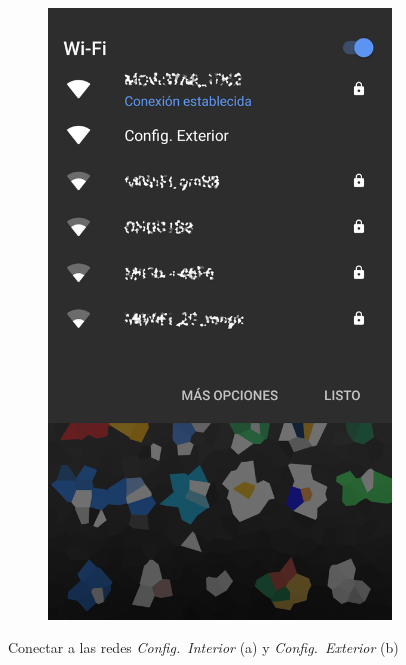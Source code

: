 \begin{figure}
\begin{subfigure}{0.49\columnwidth}
  \includegraphics[width=1\columnwidth,frame]{images/exterior-select-wifi}
  \caption{}
  \label{fig:exterior-select-wifi}
\end{subfigure}
\caption{Conectar a las redes \textit{Config.~Interior} (a) y \textit{Config.~Exterior} (b)}
\end{figure}

